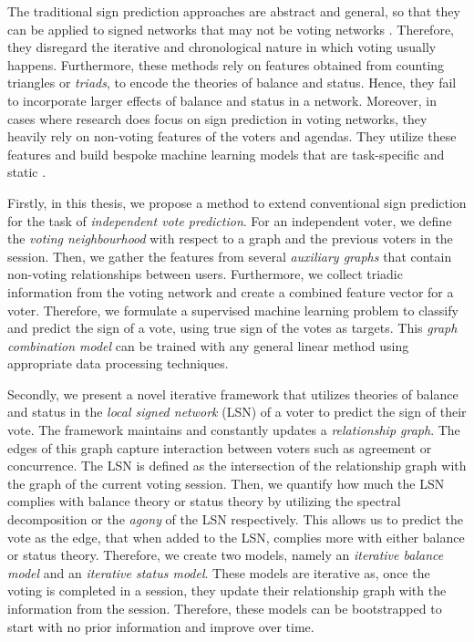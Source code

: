 The traditional sign prediction approaches are abstract and general, so that they can be applied to signed networks that may not be voting networks \cite{agrawal2013link,khodadadi2017sign,Shuang-Hong2012Friend}.
Therefore, they disregard the iterative and chronological nature in which voting usually happens.
Furthermore, these methods rely on features obtained from counting triangles or \textit{triads}, to encode the theories of balance and status.
Hence, they fail to incorporate larger effects of balance and status in a network.
Moreover, in cases where research does focus on sign prediction in voting networks, they heavily rely on non-voting features of the voters and agendas.
They utilize these features and build bespoke machine learning models that are task-specific and static \cite{karimi2019multicongress,jankowski-lorek2013MBSN}.

Firstly, in this thesis, we propose a method to extend conventional sign prediction for the task of \textit{independent vote prediction}.
For an independent voter, we define the \textit{voting neighbourhood} with respect to a graph and the previous voters in the session.
Then, we gather the features from several \textit{auxiliary graphs} that contain non-voting relationships between users.
Furthermore, we collect triadic information from the voting network and create a combined feature vector for a voter.
Therefore, we formulate a supervised machine learning problem to classify and predict the sign of a vote, using true sign of the votes as targets.
This \textit{graph combination model} can be trained with any general linear method using appropriate data processing techniques.

Secondly, we present a novel iterative framework that utilizes theories of balance and status in the \textit{local signed network} (LSN) of a voter to predict the sign of their vote.
The framework maintains and constantly updates a \textit{relationship graph}.
The edges of this graph capture interaction between voters such as agreement or concurrence.
The LSN is defined as the intersection of the relationship graph with the graph of the current voting session.
Then, we quantify how much the LSN complies with balance theory or status theory by utilizing the spectral decomposition or the \textit{agony} of the LSN respectively.
This allows us to predict the vote as the edge, that when added to the LSN, complies more with either balance or status theory.
Therefore, we create two models, namely an \textit{iterative balance model} and an \textit{iterative status model}.
These models are iterative as, once the voting is completed in a session, they update their relationship graph with the information from the session.
Therefore, these models can be bootstrapped to start with no prior information and improve over time.

